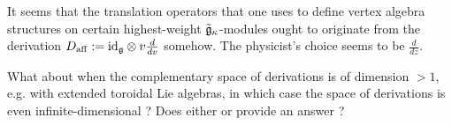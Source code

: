         \begin{remark}
            It seems that the translation operators that one uses to define vertex algebra structures on certain highest-weight $\tilde{\mathfrak{g}}_{\kappa}$-modules ought to originate from the derivation $D_{\aff} := \id_{\g} \tensor v\frac{d}{dv}$ somehow. The physicist's choice seems to be $\frac{d}{dz}$.  
        \end{remark}
        \begin{question}
            What about when the complementary space of derivations is of dimension $ > 1$, e.g. with extended toroidal Lie algebras, in which case the space of derivations is even infinite-dimensional ? Does either \cite{moody_rao_yokonuma_vertex_representations_of_toroidal_lie_algebras} or \cite{moody_rao_n_toroidal_vertex_representations} provide an answer ?
        \end{question}
